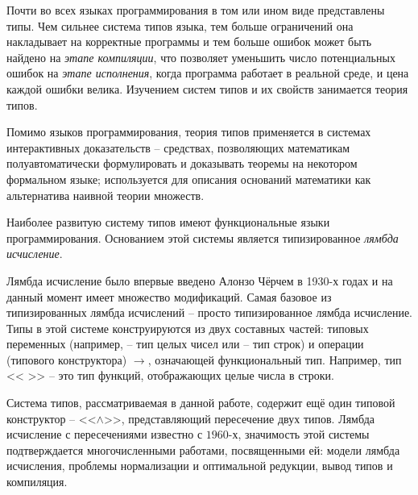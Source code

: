 \documentclass[../main.tex]{subfiles}
\begin{document}
Почти во всех языках программирования в том или ином виде представлены типы. Чем сильнее система типов языка, тем больше ограничений она накладывает на корректные программы и тем больше ошибок может быть найдено на {\it этапе компиляции}, что позволяет уменьшить число потенциальных ошибок на {\it этапе исполнения}, когда программа работает в реальной среде, и цена каждой ошибки велика. Изучением систем типов и их свойств занимается теория типов. 

Помимо языков программирования, теория типов применяется в системах интерактивных доказательств -- средствах, позволяющих математикам полуавтоматически формулировать и доказывать теоремы на некотором формальном языке; используется для описания оснований математики как альтернатива наивной теории множеств.

Наиболее развитую систему типов имеют функциональные языки программирования. Основанием этой системы является типизированное {\it лямбда исчисление}.

Лямбда исчисление было впервые введено Алонзо Чёрчем в 1930-х годах и на данный момент имеет множество модификаций. Самая базовое из типизированных лямбда исчислений -- просто типизированное лямбда исчисление. Типы в этой системе конструируются из двух составных частей: типовых переменных (например,  -- тип целых чисел или  -- тип строк) и операции (типового конструктора) $\to$, означающей функциональный тип. Например, тип << \to {}>> -- это тип функций, отображающих целые числа в строки. 

Система типов, рассматриваемая в данной работе, содержит ещё один типовой конструктор -- <<$\wedge$>>, представляющий пересечение двух типов. Лямбда исчисление с пересечениями известно с $1960$-х, значимость этой системы подтверждается многочисленными работами, посвященными ей: модели лямбда исчисления, проблемы нормализации и оптимальной редукции, вывод типов и компиляция.
\end{document}
